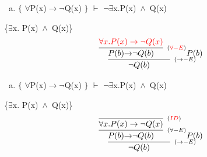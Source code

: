 \documentclass[aspectratio=43]{beamer}
\newcommand{\ria}{$\rightarrow$}
\newcommand{\fall}{$\forall$}
\newcommand{\ex}{$\exists$}
\newcommand{\nao}{$\neg$}
\newcommand{\nex}{\nao\ex}
\newcommand{\andd}{$\wedge$}
\begin{document}
    \begin{frame}[fragile]
    	
    	\begin{enumerate}[b)]
			
			\item $\{$ \fall P(x)\ria \nao Q(x) $\}$ $\vdash$ \nex  x.P(x)\ \andd\ Q(x) \\ 
			
		\end{enumerate}
        \{\ex  x. P(x)\ \andd\ Q(x)\}
        \vspace{90pt}
        \[
        \begin{array}{c}
		
        	\infer[_{(\to-E)}]
            {$\nao$ Q(b)}
            {\infer[_{(\textcolor{red}{\forall-E})}] 
            	{P(b) $\ria$ $\nao$ Q(b)}
               	{\textcolor{red}{\forall x.P(x)\rightarrow \neg Q(x)}} 
            P(b)
            }
		\end{array}
        \]
        
	\end{frame}
    
    \begin{frame}[fragile]
    	
    	\begin{enumerate}[b)]
			
			\item $\{$ \fall P(x)\ria \nao Q(x) $\}$ $\vdash$ \nex  x.P(x)\ \andd\ Q(x) \\ 
			
		\end{enumerate}
        \{\ex  x. P(x)\ \andd\ Q(x)\}
        \vspace{90pt}
        \[
        \begin{array}{c}
		
        	\infer[_{(\to-E)}]
            {$\nao$ Q(b)}
            {\infer[_{(\forall-E)}] 
            	{P(b) $\ria$ $\nao$ Q(b)}
               	{\infer[_{(\textcolor{red}{ID})}]
                	{\forall x.P(x)\to \neg Q(x)}
                    {}
                }
            P(b)
            }
		\end{array}
        \]
        
	\end{frame}
    
\end{document}
